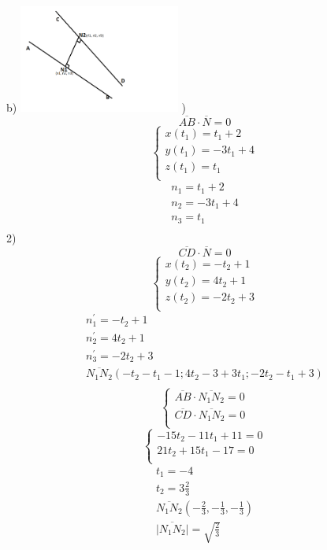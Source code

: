 \documentclass[11pt]{article}
\begin{document}
    b) \newline
    \includegraphics[width=200px]{taskOne.PNG} )
    \[\overline{AB}\cdot\overline{N}=0\]
    \[\begin{cases}
        x(t_1)=t_1+2   \\
        y(t_1)=-3t_1+4 \\
        z(t_1)=t_1     \\
    \end{cases}\]
    \begin{gather*}
        n_1=t_1+2   \\
        n_2=-3t_1+4 \\
        n_3=t_1     \\
    \end{gather*}
    2)
    \[\overline{CD}\cdot\overline{N}=0\]
    \[\begin{cases}
          x(t_2)=-t_2+1  \\
          y(t_2)=4t_2+1  \\
          z(t_2)=-2t_2+3 \\
    \end{cases}\]
    \begin{gather*}
        n_1^\prime=-t_2+1  \\
        n_2^\prime=4t_2+1  \\
        n_3^\prime=-2t_2+3 \\
        \overline{N_1N_2}(-t_2-t_1-1; 4t_2-3+3t_1; -2t_2-t_1+3)\\
    \end{gather*}
    \[\begin{cases}
          \overline{AB}\cdot\overline{N_1N_2}=0  \\
          \overline{CD}\cdot\overline{N_1N_2}=0  \\
    \end{cases}\]
    \[\begin{cases}
          -15t_2-11t_1+11=0  \\
          21t_2+15t_1-17=0  \\
    \end{cases}\]
    \begin{gather*}
        t_1=-4\\
        t_2=3\frac{2}{3}\\
        \overline{N_1N_2}(-\frac{2}{3}, -\frac{1}{3}, -\frac{1}{3})\\
        \overline{|N_1N_2|}=\sqrt {\frac{2}{3}}\\
    \end{gather*}
\end{document}
